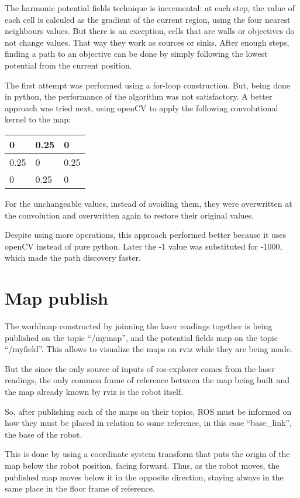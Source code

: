 \documentclass[a4paper,twocolumn]{article}
\begin{document}
    The harmonic potential fields technique is incremental: at each step, the value of each cell is calculed as the gradient of the current region, using the four nearest neighbours values. But there is an exception, cells that are walls or objectives do not change values. That way they work as sources or sinks. After enough steps, finding a path to an objective can be done by simply following the lowest potential from the current position.

    The first attempt was performed using a for-loop construction. But, being done in python, the performance of the algorithm was not satisfactory. A better approach was tried next, using openCV to apply the following convolutional kernel to the map:

    \begin{tabular}{|l|l|l|}
        \hline
        0 & 0.25 & 0 \\
        \hline
        0.25 & 0 & 0.25 \\
        \hline
        0 & 0.25 & 0 \\
        \hline
    \end{tabular}

    For the unchangeable values, instead of avoiding them, they were overwritten at the convolution and overwritten again to restore their original values.

    Despite using more operations, this approach performed better because it uses openCV instead of pure python. Later the -1 value was substituted for -1000, which made the path discovery faster.

\section{Map publish}
    The worldmap constructed by joinning the laser readings together is being published on the topic ``/mymap'', and the potential fields map on the topic ``/myfield''. This allows to visualize the maps on rviz while they are being made. 
    
    But the since the only source of inputs of ros-explorer comes from the laser readings, the only common frame of reference between the map being built and the map already known by rviz is the robot itself.

    So, after publishing each of the maps on their topics, ROS must be informed on how they must be placed in relation to some reference, in this case ``base\_link'', the base of the robot.

    This is done by using a coordinate system transform that puts the origin of the map below the robot position, facing forward. Thus, as the robot moves, the published map moves below it in the opposite direction, staying always in the same place in the floor frame of reference.
    
\end{document}
